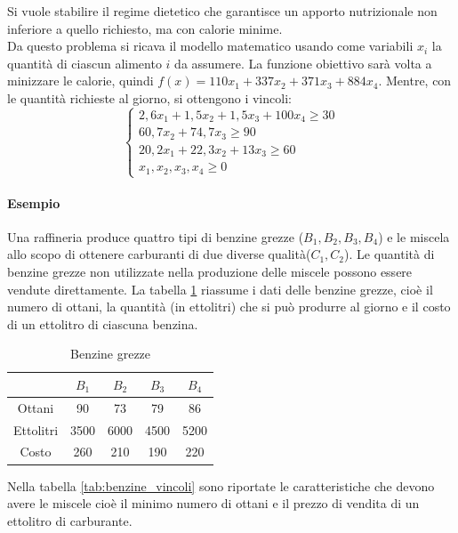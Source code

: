 \documentclass{article}
\begin{document}
Si vuole stabilire il regime dietetico che garantisce un apporto nutrizionale
non inferiore a quello richiesto, ma con calorie minime.\\
Da questo problema si ricava il modello matematico usando come variabili $x_i$ 
la quantità di ciascun alimento $i$ da assumere. La funzione obiettivo sarà volta 
a minizzare le calorie, quindi $f(x) = 110x_1 + 337x_2 + 371x_3 + 884x_4$. Mentre,
con le quantità richieste al giorno, si ottengono i vincoli: 
\begin{equation*}
  \begin{cases}
    2,6x_1 + 1,5x_2 + 1,5x_3 + 100x_4 \geq 30 \\
    60,7x_2 + 74,7x_3 \geq 90 \\
    20,2x_1 + 22,3x_2 + 13x_3 \geq 60 \\
    x_1, x_2, x_3, x_4 \geq 0
  \end{cases}
\end{equation*}

\paragraph{Esempio}
Una raffineria produce quattro tipi di benzine grezze ($B_1, B_2, B_3, B_4$) e le
miscela allo scopo di ottenere carburanti di due diverse qualità($C_1, C_2$). 
Le quantità di benzine grezze non utilizzate nella produzione delle miscele
possono essere vendute direttamente. La tabella \ref{tab:benzine_grezze}
riassume i dati delle benzine grezze, cioè il numero di ottani, 
la quantità (in ettolitri) che si può produrre al giorno e il costo di un 
ettolitro di ciascuna benzina.

\begin{table}
  \center
  \begin{tabular}
  { |c|c|c|c|c| }
    \hline

    & $B_1$ & $B_2$ & $B_3$ & $B_4$ \\
    \hline
    Ottani & 90 & 73 & 79 & 86 \\ 
    Ettolitri & 3500 & 6000 & 4500 & 5200 \\ 
    Costo & 260 & 210 & 190 & 220 \\
    \hline
  \end{tabular}
  \caption{Benzine grezze}
  \label{tab:benzine_grezze}
\end{table}

Nella tabella \ref{tab:benzine_vincoli} sono riportate le caratteristiche che 
devono avere le miscele cioè il minimo numero di ottani e il prezzo di vendita 
di un ettolitro di carburante.
\end{document}
